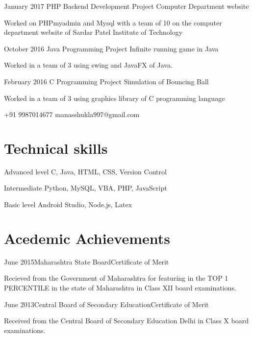 \documentclass{tccv}
\begin{document}
\begin{eventlist}

\item{January 2017}
     {PHP Backend Development Project}
     {Computer Department website}
     
     Worked on PHPmyadmin and Mysql with a team of 10
     on the computer department website of Sardar Patel Institute
     of Technology

\item{October 2016}
     {Java Programming Project}
     {Infinite running game in Java}
     
     Worked in a team of 3 using swing and JavaFX of Java.

\item{February 2016}
     {C Programming Project}
     {Simulation of Bouncing Ball}
     
     Worked in a team of 3 using graphics library of C
     programming language

\end{eventlist}

    {+91 9987014677}
    {manasshukla997@gmail.com}

\section{Technical skills}

\begin{factlist}

\item{Advanced level}
     {C, Java, HTML, CSS, Version Control}

\item{Intermediate}
     {Python, MySQL, VBA, PHP, JavaScript}

\item{Basic level}
     {Android Studio, Node.js, Latex}

\end{factlist}

\section{Acedemic Achievements}

\begin{eventlist}

\item{June 2015}{Maharashtra State Board}{Certificate of Merit}

Recieved from the Government of Maharashtra for featuring in the
TOP 1 PERCENTILE in the state of Maharashtra in Class XII board examinations.

\item{June 2013}{Central Board of Secondary Education}{Certificate of Merit}

Received from the Central Board of Secondary Education Delhi in Class X board examinations.

\end{eventlist}
\end{document}
